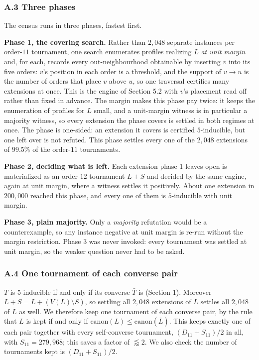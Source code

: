 \documentclass[
]{article}
\begin{document}
\subsubsection{A.3 Three phases}\label{a.3-three-phases}

The census runs in three phases, fastest first.

\textbf{Phase 1, the covering search.} Rather than \(2{,}048\) separate
instances per order-\(11\) tournament, one search enumerates profiles
realizing \(L\) \emph{at unit margin} and, for each, records every
out-neighbourhood obtainable by inserting \(v\) into its five orders:
\(v\)'s position in each order is a threshold, and the support of
\(v \to u\) is the number of orders that place \(v\) above \(u\), so one
traversal certifies many extensions at once. This is the engine of
Section 5.2 with \(v\)'s placement read off rather than fixed in
advance. The margin makes this phase pay twice: it keeps the enumeration
of profiles for \(L\) small, and a unit-margin witness is in particular
a majority witness, so every extension the phase covers is settled in
both regimes at once. The phase is one-sided: an extension it covers is
certified \(5\)-inducible, but one left over is not refuted. This phase
settles every one of the \(2{,}048\) extensions of \(99.5\%\) of the
order-\(11\) tournaments.

\textbf{Phase 2, deciding what is left.} Each extension phase 1 leaves
open is materialized as an order-\(12\) tournament \(L + S\) and decided
by the same engine, again at unit margin, where a witness settles it
positively. About one extension in \(200{,}000\) reached this phase, and
every one of them is \(5\)-inducible with unit margin.

\textbf{Phase 3, plain majority.} Only a \emph{majority} refutation
would be a counterexample, so any instance negative at unit margin is
re-run without the margin restriction. Phase 3 was never invoked: every
tournament was settled at unit margin, so the weaker question never had
to be asked.

\subsubsection{A.4 One tournament of each converse
pair}\label{a.4-one-tournament-of-each-converse-pair}

\(T\) is \(5\)-inducible if and only if its converse \(\bar{T}\) is
(Section 1). Moreover
\(\overline{L + S} = \bar{L} + (V(L) \setminus S)\), so settling all
\(2{,}048\) extensions of \(L\) settles all \(2{,}048\) of \(\bar{L}\)
as well. We therefore keep one tournament of each converse pair, by the
rule that \(L\) is kept if and only if
\(\mathrm{canon}(L) \le \mathrm{canon}(\bar{L})\). This keeps exactly
one of each pair together with every self-converse tournament,
\((D_{11} + S_{11})/2\) in all, with \(S_{11} = 279{,}968\); this saves
a factor of \(\lessapprox 2\). We also check the number of tournaments
kept is \((D_{11} + S_{11})/2\).
\end{document}
